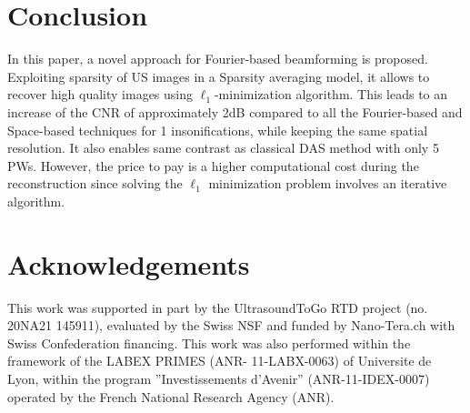 \documentclass[conference]{IEEEtran}
\begin{document}
\section{Conclusion}
\label{sec:Conc}
In this paper, a novel approach for Fourier-based beamforming is proposed. Exploiting sparsity of US images in a Sparsity averaging model, it allows to recover high quality images using $\ell_{1}$-minimization algorithm. This leads to an increase of the CNR of approximately 2dB compared to all the Fourier-based and Space-based techniques for 1 insonifications, while keeping the same spatial resolution. It also enables same contrast as classical DAS method with only 5 PWs. However, the price to pay is a higher computational cost during the reconstruction since solving the $\ell_1$ minimization problem involves an iterative algorithm. 

\section*{Acknowledgements}
This work was supported in part by the UltrasoundToGo RTD project (no. 20NA21 145911), evaluated by the Swiss NSF and funded by Nano-Tera.ch with Swiss Confederation financing. This work was also performed within the framework of the LABEX PRIMES (ANR- 11-LABX-0063) of Universite de Lyon, within the program ”Investissements d’Avenir” (ANR-11-IDEX-0007) operated by the French National Research Agency (ANR).



\end{document}
